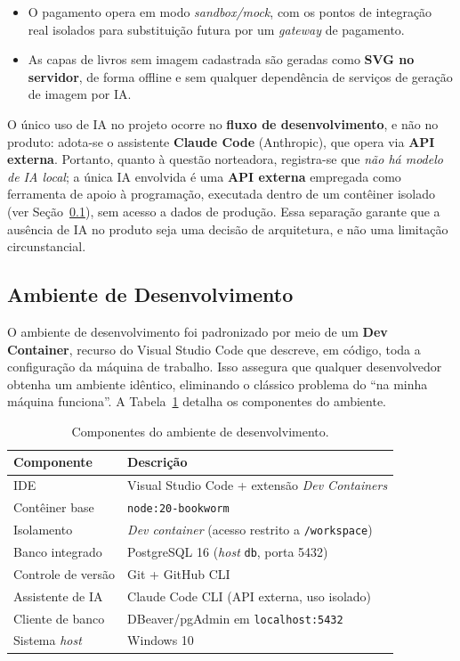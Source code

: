 \documentclass[a4paper,12pt]{article}
\begin{document}
\begin{itemize}[leftmargin=2em]
    \item O pagamento opera em modo \emph{sandbox/mock}, com os pontos de integração
    real isolados para substituição futura por um \emph{gateway} de pagamento.
    \item As capas de livros sem imagem cadastrada são geradas como \textbf{SVG no
    servidor}, de forma offline e sem qualquer dependência de serviços de geração de
    imagem por IA.
\end{itemize}

O único uso de IA no projeto ocorre no \textbf{fluxo de desenvolvimento}, e não no
produto: adota-se o assistente \textbf{Claude Code} (Anthropic), que opera via
\textbf{API externa}. Portanto, quanto à questão norteadora, registra-se que
\emph{não há modelo de IA local}; a única IA envolvida é uma \textbf{API externa}
empregada como ferramenta de apoio à programação, executada dentro de um contêiner
isolado (ver Seção~\ref{sec:devenv}), sem acesso a dados de produção. Essa separação
garante que a ausência de IA no produto seja uma decisão de arquitetura, e não uma
limitação circunstancial.

\subsection{Ambiente de Desenvolvimento}
\label{sec:devenv}

O ambiente de desenvolvimento foi padronizado por meio de um \textbf{Dev Container},
recurso do Visual Studio Code que descreve, em código, toda a configuração da máquina de
trabalho. Isso assegura que qualquer desenvolvedor obtenha um ambiente idêntico,
eliminando o clássico problema do ``na minha máquina funciona''. A
Tabela~\ref{tab:devenv} detalha os componentes do ambiente.

\begin{table}[H]
    \centering
    \caption{Componentes do ambiente de desenvolvimento.}
    \label{tab:devenv}
    \begin{tabular}{ll}
        \toprule
        \textbf{Componente} & \textbf{Descrição} \\
        \midrule
        IDE                & Visual Studio Code + extensão \emph{Dev Containers} \\
        Contêiner base     & \texttt{node:20-bookworm} \\
        Isolamento         & \emph{Dev container} (acesso restrito a \texttt{/workspace}) \\
        Banco integrado    & PostgreSQL 16 (\emph{host} \texttt{db}, porta 5432) \\
        Controle de versão & Git + GitHub CLI \\
        Assistente de IA   & Claude Code CLI (API externa, uso isolado) \\
        Cliente de banco   & DBeaver/pgAdmin em \texttt{localhost:5432} \\
        Sistema \emph{host}& Windows 10 \\
        \bottomrule
    \end{tabular}
\end{table}
\end{document}

